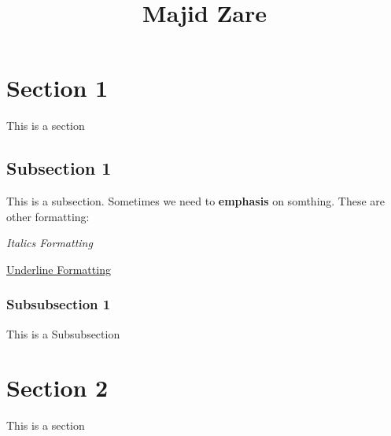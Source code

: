 \documentclass{article}
\title{Majid Zare}
\author{}
\date{}
\begin{document}

\section{Section 1}
This is a section

\subsection{Subsection 1}
This is a subsection. Sometimes we need to \textbf{emphasis} on somthing. These are other formatting:

\emph{Italics Formatting}

\underline{Underline Formatting}

\subsubsection{Subsubsection 1}
This is a Subsubsection

\section{Section 2}
This is a section
\end{document}
